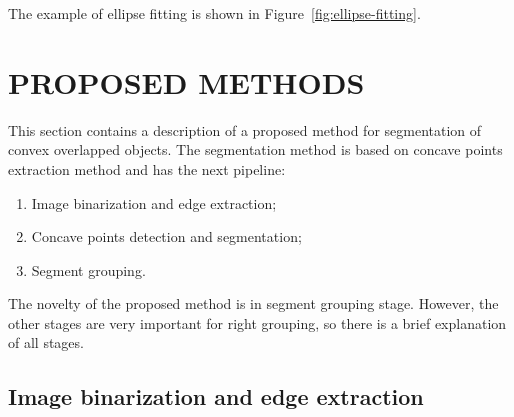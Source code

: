 \documentclass{lutmscthesis}[2010/09/22]
\begin{document}
The example of ellipse fitting is shown in Figure~\ref{fig:ellipse-fitting}.

\begin{figure}[htp]
\end{figure}


\section{PROPOSED METHODS}
\label{sec:proposed}

This section contains a description of a proposed method for segmentation of convex overlapped objects.
The segmentation method is based on concave points extraction method and has the next pipeline: 

\begin{enumerate}
    \item Image binarization and edge extraction;
    \item Concave points detection and segmentation;
    \item Segment grouping.
\end{enumerate}

The novelty of the proposed method is in segment grouping stage. However, the other stages are very important for right grouping, so there is a brief explanation of all stages.


\subsection{Image binarization and edge extraction}
\end{document}
